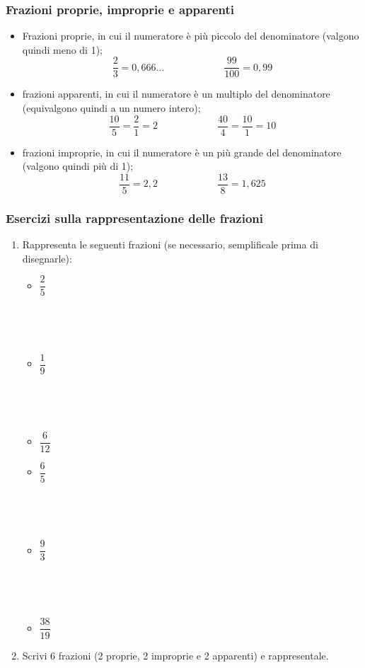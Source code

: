 \documentclass[]{beamer}
\theoremstyle{plain}
\begin{document}
\begin{frame}
\frametitle{Frazioni proprie, improprie e apparenti}
\begin{itemize}
  \item \alert{Frazioni proprie}, in cui il numeratore è più piccolo del denominatore (valgono quindi \alert{meno di 1});
  \[\frac{2}{3}=0,666\ldots\qquad\qquad\qquad\frac{99}{100}=0,99\]\pause
  \item \alert{frazioni apparenti}, in cui il numeratore è un multiplo del denominatore (equivalgono quindi a \alert{un numero intero});
  \[\frac{10}{5}=\frac{2}{1}=2\qquad\qquad\qquad\frac{40}{4}=\frac{10}{1}=10\]\pause
  \item \alert{frazioni improprie}, in cui il numeratore è un più grande del denominatore (valgono quindi \alert{più di 1});
  \[\frac{11}{5}=2,2\qquad\qquad\qquad\frac{13}{8}=1,625\]
\end{itemize}
  

\end{frame}


\begin{frame}
  \frametitle{Esercizi sulla rappresentazione delle frazioni}
  \begin{enumerate}
    \item Rappresenta le seguenti frazioni (se necessario, semplificale prima di disegnarle):
    \begin{multicols}{2}
      \begin{itemize}
          \item $ \dfrac{2}{5} $
          
          ~

          ~
          \item $ \dfrac{1}{9} $
          
          ~

          ~
          \item $ \dfrac{6}{12} $
          \item $ \dfrac{6}{5} $
          
          ~

          ~
          \item $ \dfrac{9}{3} $
          
          ~

          ~
          \item $ \dfrac{38}{19} $
      \end{itemize}
    \end{multicols}
    \item Scrivi 6 frazioni (2 proprie, 2 improprie e 2 apparenti) e rappresentale.
  \end{enumerate}
  \end{frame}
  
\end{document}
